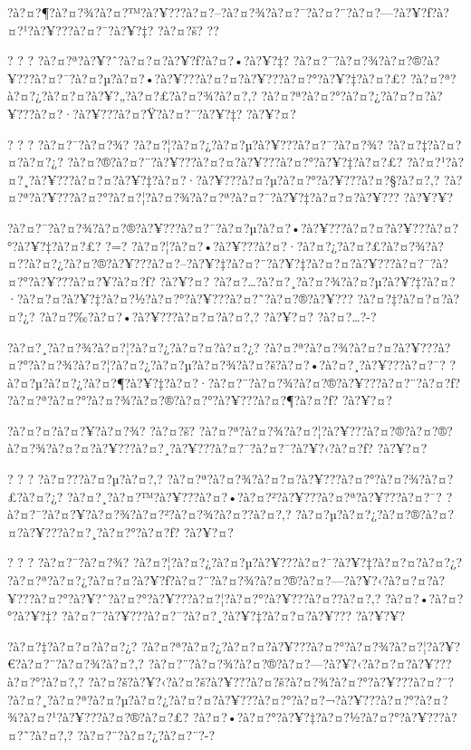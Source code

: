 \documentclass[11pt, openany]{book}
\begin{document}
{{{{{{{{{{{{{{{?à?¤?¶?à?¤?¾?à?¤?™?à?¥???à?¤?--?à?¤?¾?à?¤?¯?à?¤?¨?à?¤?---?à?¥?ƒ?à?¤?¹?à?¥???à?¤?¯?à?¥?‡?
?à?¤?š? ?\textbar{}?

? ? ? ?à?¤?ª?à?¥?ˆ?à?¤?¤?à?¥?ƒ?à?¤?•?à?¥?‡?
?à?¤?¯?à?¤?¾?à?¤?®?à?¥???à?¤?¯?à?¤?µ?à?¤?•?à?¥???à?¤?¤?à?¥???à?¤?°?à?¥?‡?à?¤?£?
?à?¤?ª?à?¤?¿?à?¤?¤?à?¥?„?à?¤?£?à?¤?¾?à?¤?‚?
?à?¤?ª?à?¤?°?à?¤?¿?à?¤?¤?à?¥???à?¤?·?à?¥???à?¤?Ÿ?à?¤?¯?à?¥?‡? ?à?¥?¤?

? ? ? ?à?¤?¯?à?¤?¾? ?à?¤?¦?à?¤?¿?à?¤?µ?à?¥???à?¤?¯?à?¤?¾?
?à?¤?‡?à?¤?¤?à?¤?¿? ?à?¤?®?à?¤?¨?à?¥???à?¤?¤?à?¥???à?¤?°?à?¥?‡?à?¤?£?
?à?¤?¹?à?¤?¸?à?¥???à?¤?¤?à?¥?‡?à?¤?·?à?¥???à?¤?µ?à?¤?°?à?¥???à?¤?§?à?¤?‚?
?à?¤?ª?à?¥???à?¤?°?à?¤?¦?à?¤?¾?à?¤?ª?à?¤?¯?à?¥?‡?à?¤?¤?à?¥??? ?à?¥?¥?

?à?¤?¯?à?¤?¾?à?¤?®?à?¥???à?¤?¯?à?¤?µ?à?¤?•?à?¥???à?¤?¤?à?¥???à?¤?°?à?¥?‡?à?¤?£?
?=?
?à?¤?¦?à?¤?•?à?¥???à?¤?·?à?¤?¿?à?¤?£?à?¤?¾?à?¤?­?à?¤?¿?à?¤?®?à?¥???à?¤?--?à?¥?‡?à?¤?¨?à?¥?‡?à?¤?¤?à?¥???à?¤?¯?à?¤?°?à?¥???à?¤?¥?à?¤?ƒ?
?à?¥?¤?
?à?¤?\ldots{}?à?¤?¸?à?¤?¾?à?¤?µ?à?¥?‡?à?¤?·?à?¤?¤?à?¥?‡?à?¤?½?à?¤?°?à?¥???à?¤?˜?à?¤?®?à?¥???
?à?¤?‡?à?¤?¤?à?¤?¿? ?à?¤?‰?à?¤?•?à?¥???à?¤?¤?à?¤?‚? ?à?¥?¤?
?à?¤?\ldots{}?-?

?à?¤?¸?à?¤?¾?à?¤?¦?à?¤?¿?à?¤?¤?à?¤?¿?
?à?¤?ª?à?¤?¾?à?¤?¤?à?¥???à?¤?°?à?¤?¾?à?¤?¦?à?¤?¿?à?¤?µ?à?¤?¾?à?¤?š?à?¤?•?à?¤?¸?à?¥???à?¤?¯?
?à?¤?µ?à?¤?¿?à?¤?¶?à?¥?‡?à?¤?·?à?¤?¨?à?¤?¾?à?¤?®?à?¥???à?¤?¨?à?¤?ƒ?
?à?¤?ª?à?¤?°?à?¤?¾?à?¤?®?à?¤?°?à?¥???à?¤?¶?à?¤?ƒ? ?à?¥?¤?

?à?¤?¤?à?¤?¥?à?¤?¾? ?à?¤?š?
?à?¤?ª?à?¤?¾?à?¤?¦?à?¥???à?¤?®?à?¤?®?à?¤?¾?à?¤?¤?à?¥???à?¤?¸?à?¥???à?¤?¯?à?¤?¯?à?¥?‹?à?¤?ƒ?
?à?¥?¤?

? ? ? ?à?¤???à?¤?µ?à?¤?‚?
?à?¤?ª?à?¤?¾?à?¤?¤?à?¥???à?¤?°?à?¤?¾?à?¤?£?à?¤?¿?
?à?¤?¸?à?¤?™?à?¥???à?¤?•?à?¤?²?à?¥???à?¤?ª?à?¥???à?¤?¯?
?à?¤?¯?à?¤?¥?à?¤?¾?à?¤?²?à?¤?¾?à?¤?­?à?¤?‚?
?à?¤?µ?à?¤?¿?à?¤?®?à?¤?¤?à?¥???à?¤?¸?à?¤?°?à?¤?ƒ? ?à?¥?¤?

? ? ? ?à?¤?¯?à?¤?¾? ?à?¤?¦?à?¤?¿?à?¤?µ?à?¥???à?¤?¯?à?¥?‡?à?¤?¤?à?¤?¿?
?à?¤?ª?à?¤?¿?à?¤?¤?à?¥?ƒ?à?¤?¨?à?¤?¾?à?¤?®?à?¤?---?à?¥?‹?à?¤?¤?à?¥???à?¤?°?à?¥?ˆ?à?¤?°?à?¥???à?¤?¦?à?¤?°?à?¥???à?¤?­?à?¤?‚?
?à?¤?•?à?¤?°?à?¥?‡? ?à?¤?¨?à?¥???à?¤?¯?à?¤?¸?à?¥?‡?à?¤?¤?à?¥??? ?à?¥?¥?

?à?¤?‡?à?¤?¤?à?¤?¿?
?à?¤?ª?à?¤?¿?à?¤?¤?à?¥???à?¤?°?à?¤?¾?à?¤?¦?à?¥?€?à?¤?¨?à?¤?¾?à?¤?‚?
?à?¤?¨?à?¤?¾?à?¤?®?à?¤?---?à?¥?‹?à?¤?¤?à?¥???à?¤?°?à?¤?‚?
?à?¤?š?à?¥?‹?à?¤?š?à?¥???à?¤?š?à?¤?¾?à?¤?°?à?¥???à?¤?¯?
?à?¤?¸?à?¤?ª?à?¤?µ?à?¤?¿?à?¤?¤?à?¥???à?¤?°?à?¤?¬?à?¥???à?¤?°?à?¤?¾?à?¤?¹?à?¥???à?¤?®?à?¤?£?
?à?¤?•?à?¤?°?à?¥?‡?à?¤?½?à?¤?°?à?¥???à?¤?˜?à?¤?‚? ?à?¤?¨?à?¤?¿?à?¤?¨?-?

}}}}}}}}}}}}}}}
\end{document}
